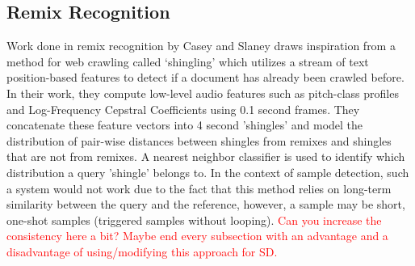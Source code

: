 \documentclass{article}
\begin{document}
\subsection{Remix Recognition}
Work done in remix recognition by Casey and Slaney \cite{caseyRemix} draws inspiration from a method for web crawling called `shingling' which utilizes a stream of text position-based features to detect if a document has already been crawled before. In their work, they compute low-level audio features such as pitch-class profiles and Log-Frequency Cepstral Coefficients using 0.1 second frames. They concatenate these feature vectors into 4 second 'shingles' and model the distribution of pair-wise distances between shingles from remixes and shingles that are not from remixes. A nearest neighbor classifier is used to identify which distribution a query 'shingle' belongs to. In the context of sample detection, such a system would not work due to the fact that this method relies on long-term similarity between the query and the reference, however, a sample may be short, one-shot samples (triggered samples without looping).
{\textcolor{red}{Can you increase the consistency here a bit? Maybe end every subsection with an advantage and a disadvantage of using/modifying this approach for SD.}}
\end{document}
